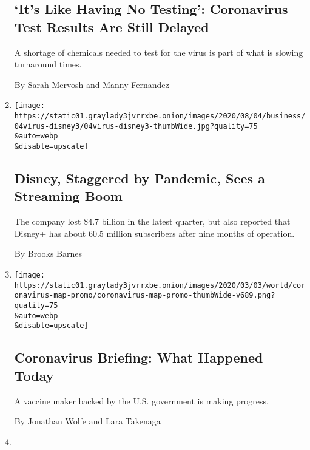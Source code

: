 \begin{enumerate}
  \hypertarget{its-like-having-no-testing-coronavirus-test-results-are-still-delayed}{%
  \subsection{`It's Like Having No Testing': Coronavirus Test Results
  Are Still
  Delayed}\label{its-like-having-no-testing-coronavirus-test-results-are-still-delayed}}

  A shortage of chemicals needed to test for the virus is part of what
  is slowing turnaround times.

  By Sarah Mervosh and Manny Fernandez
\item
  \href{/2020/08/04/business/media/disney-earnings-coronavirus.html}{}

  \texttt{[image: https://static01.graylady3jvrrxbe.onion/images/2020/08/04/business/04virus-disney3/04virus-disney3-thumbWide.jpg?quality=75\\\&auto=webp\\\&disable=upscale]}

  \hypertarget{disney-staggered-by-pandemic-sees-a-streaming-boom}{%
  \subsection{Disney, Staggered by Pandemic, Sees a Streaming
  Boom}\label{disney-staggered-by-pandemic-sees-a-streaming-boom}}

  The company lost \$4.7 billion in the latest quarter, but also
  reported that Disney+ has about 60.5 million subscribers after nine
  months of operation.

  By Brooks Barnes
\item
  \href{/2020/08/04/us/coronavirus-today.html}{}

  \texttt{[image: https://static01.graylady3jvrrxbe.onion/images/2020/03/03/world/coronavirus-map-promo/coronavirus-map-promo-thumbWide-v689.png?quality=75\\\&auto=webp\\\&disable=upscale]}

  \hypertarget{coronavirus-briefing-what-happened-today}{%
  \subsection{Coronavirus Briefing: What Happened
  Today}\label{coronavirus-briefing-what-happened-today}}

  A vaccine maker backed by the U.S. government is making progress.

  By Jonathan Wolfe and Lara Takenaga
\item
  \href{/2020/08/04/briefing/vaccine-stimulus-beirut.html}{}


\end{enumerate}
